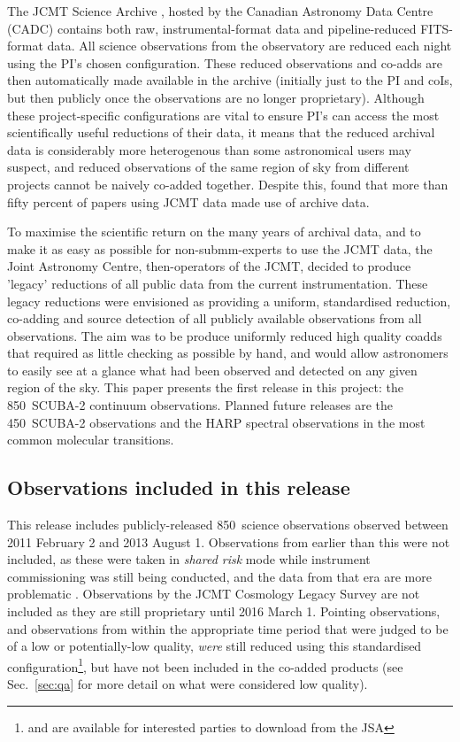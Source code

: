 \documentclass[usenatbib]{mn2e}
\newcommand{\um}{\micron}
\newcommand{\sref}[1]{Sec.~\ref{#1}}
\begin{document}
The JCMT Science Archive \citep{2015Economou}, hosted by the Canadian
Astronomy Data Centre (CADC) contains both raw, instrumental-format
data and pipeline-reduced FITS-format data. All science observations
from the observatory are reduced each night using the PI's chosen
configuration.  These reduced observations and co-adds are then
automatically made available in the archive (initially just to the PI
and coIs, but then publicly once the observations are no longer
proprietary). Although these project-specific configurations are vital
to ensure PI's can access the most scientifically useful reductions of
their data, it means that the reduced archival data is considerably
more heterogenous than some astronomical users may suspect, and
reduced observations of the same region of sky from different projects
cannot be naively co-added together. Despite this,
\citet{Bell2014} found that more than fifty percent of
papers using JCMT data made use of archive data.

To maximise the scientific return on the many years of archival data,
and to make it as easy as possible for non-submm-experts to use the
JCMT data, the Joint Astronomy Centre, then-operators of the JCMT,
decided to produce 'legacy' reductions of all public data from the
current instrumentation. These legacy reductions were envisioned as
providing a uniform, standardised reduction, co-adding and source
detection of all publicly available observations from all
observations. The aim was to be produce uniformly reduced high quality
coadds that required as little checking as possible by hand, and would
allow astronomers to easily see at a glance what had been observed and
detected on any given region of the sky. This paper presents the first
release in this project: the 850\um\ SCUBA-2 continuum
observations. Planned future releases are the 450\um\ SCUBA-2
observations and the HARP spectral observations in the most
common molecular transitions.



\subsection{Observations included in this release}

This release includes publicly-released 850\um\ science observations observed
between 2011 February 2 and
2013 August 1. Observations from earlier than this were not included, as
these were taken in \emph{shared risk} mode while instrument
commissioning was still being conducted, and the data from that era
are more problematic \citep{SC19,Dempsey2010}.  Observations by the JCMT Cosmology Legacy Survey
\citep{Geach2013} are not included as they are still
proprietary until 2016 March 1. Pointing observations, and observations from within the
appropriate time period that were judged to be of a low or
potentially-low quality, \emph{were} still reduced using this
standardised configuration\footnote{and are available for interested
  parties to download from the JSA}, but have not been included in the
co-added products (see \sref{sec:qa} for more detail on what were
considered low quality).
\end{document}
